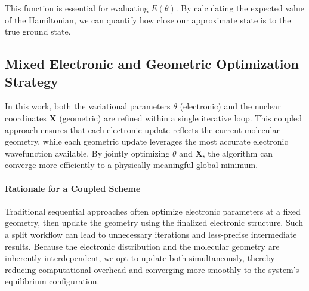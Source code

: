 This function is essential for evaluating \(E(\theta)\). By calculating the expected value of the Hamiltonian, we can quantify how close our approximate state is to the true ground state.

\subsection{Mixed Electronic and Geometric Optimization Strategy}

In this work, both the variational parameters \(\theta\) (electronic) and the nuclear coordinates \(\mathbf{X}\) (geometric) are refined within a single iterative loop. This coupled approach ensures that each electronic update reflects the current molecular geometry, while each geometric update leverages the most accurate electronic wavefunction available. By jointly optimizing \(\theta\) and \(\mathbf{X}\), the algorithm can converge more efficiently to a physically meaningful global minimum.

\paragraph{Rationale for a Coupled Scheme}
Traditional sequential approaches often optimize electronic parameters at a fixed geometry, then update the geometry using the finalized electronic structure. Such a split workflow can lead to unnecessary iterations and less-precise intermediate results. Because the electronic distribution and the molecular geometry are inherently interdependent, we opt to update both simultaneously, thereby reducing computational overhead and converging more smoothly to the system's equilibrium configuration.


